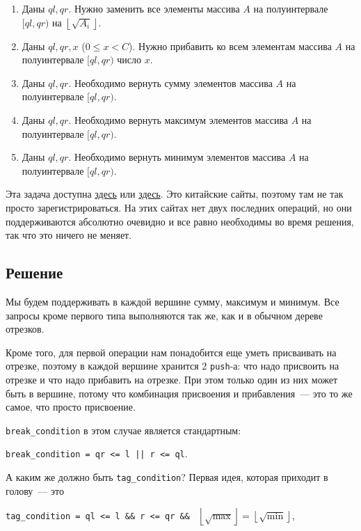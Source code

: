 \begin{enumerate}
    \item Даны $ql, qr$. Нужно заменить все элементы массива $A$ на полуинтервале $[ql, qr)$ на $\left\lfloor \sqrt{A_i} \right\rfloor$.
    \item Даны $ql, qr, x$ ($0 \le x < C$). Нужно прибавить ко всем элементам массива $A$ на полуинтервале $[ql, qr)$ число $x$.
    \item Даны $ql, qr$. Необходимо вернуть сумму элементов массива $A$ на полуинтервале $[ql, qr)$.
    \item Даны $ql, qr$. Необходимо вернуть максимум элементов массива $A$ на полуинтервале $[ql, qr)$.
    \item Даны $ql, qr$. Необходимо вернуть минимум элементов массива $A$ на полуинтервале $[ql, qr)$.
\end{enumerate}

Эта задача доступна \href{https://vjudge.net/problem/HDU-5828}{здесь} или \href{http://acm.hdu.edu.cn/showproblem.php?pid=5828}{здесь}. Это китайские сайты, поэтому там не так просто зарегистрироваться.
На этих сайтах нет двух последних операций, но они поддерживаются абсолютно очевидно и все равно необходимы во время решения, так что это ничего не меняет.

\subsection{Решение}

Мы будем поддерживать в каждой вершине сумму, максимум и минимум. Все запросы кроме первого типа выполняются так же, как и в обычном дереве отрезков.

Кроме того, для первой операции нам понадобится еще уметь присваивать на отрезке, поэтому в каждой вершине хранится $2$ \verb+push+-а: что надо присвоить на отрезке и что надо прибавить на отрезке. При этом только один из них может быть в вершине, потому что комбинация присвоения и прибавления~--- это то же самое, что просто присвоение.

\verb+break_condition+ в этом случае является стандартным:

\verb+break_condition = qr <= l || r <= ql+.

А каким же должно быть \verb+tag_condition+? Первая идея, которая приходит в голову~--- это

\verb+tag_condition = ql <= l && r <= qr && + $\left\lfloor \sqrt{\max} \right\rfloor = \left\lfloor \sqrt{\min} \right\rfloor$,

